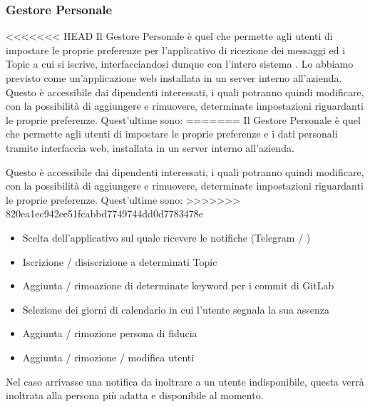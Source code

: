 		
	
	\subsubsection{Gestore Personale}\label{TecnologieGestorePersonale}
<<<<<<< HEAD
	Il Gestore Personale è quel  che permette agli utenti di impostare le proprie preferenze per l'applicativo di ricezione dei messaggi ed i Topic a cui si iscrive, interfacciandosi dunque con l'intero sistema \progetto.
	Lo abbiamo previsto come un'applicazione web installata in un server interno all'azienda.
	Questo è accessibile dai dipendenti interessati, i quali potranno quindi modificare, con la possibilità di aggiungere e rimuovere, determinate impostazioni riguardanti le proprie preferenze.
	Quest'ultime sono:
=======
	Il Gestore Personale è quel  che permette agli utenti di impostare le
	proprie preferenze e i dati personali tramite interfaccia web, installata in un server
	interno all'azienda.

	Questo è accessibile dai dipendenti interessati, i quali potranno quindi modificare, con
	la possibilità di aggiungere e rimuovere, determinate impostazioni riguardanti le proprie
	preferenze. Quest'ultime sono:
>>>>>>> 820ea1ec942ee51fcabbd7749744dd0d7783478e
	\begin{itemize}
		\item Scelta dell'applicativo sul quale ricevere le notifiche (Telegram / \mail)
		\item Iscrizione / disiscrizione a determinati Topic
		\item Aggiunta / rimoazione di determinate keyword per i commit di GitLab
		\item Selezione dei giorni di calendario in cui l'utente segnala la sua assenza
		\item Aggiunta / rimozione persona di fiducia
		\item Aggiunta / rimozione / modifica utenti
	\end{itemize}
	Nel caso arrivasse una notifica da inoltrare a un utente indisponibile,
	questa verrà inoltrata alla persona più adatta e disponibile al momento.

